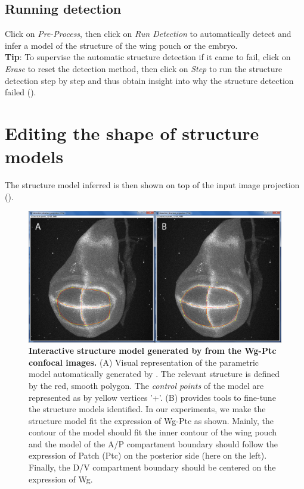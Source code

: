 \subsection{Running detection}
Click on \textit{Pre-Process}, then click on \textit{Run Detection} to automatically detect and infer a model of the structure of the wing pouch or the embryo.\\

\textbf{Tip}: To supervise the automatic structure detection if it came to fail, click on \textit{Erase} to reset the detection method, then click on \textit{Step} to run the structure detection step by step and thus obtain insight into why the structure detection failed ().

\section{Editing the shape of structure models}\label{sec:edit_structure_before_validation}
The structure model inferred is then shown on top of the input image projection ().

\begin{figure}[!h]
\centering
\includegraphics[scale=0.26]{images/wingj_structure_detection.jpg}
\caption{\textbf{Interactive structure model generated by \wingj from the Wg-Ptc confocal images.} (A) Visual representation of the parametric model automatically generated by \wingj. The relevant structure is defined by the red, smooth polygon. The \emph{control points} of the model are represented as by yellow vertices '+'. (B) \wingj provides tools to fine-tune the structure models identified. In our experiments, we make the structure model fit the expression of Wg-Ptc as shown. Mainly, the contour of the model should fit the inner contour of the wing pouch and the model of the A/P compartment boundary should follow the expression of Patch (Ptc) on the posterior side (here on the left). Finally, the D/V compartment boundary should be centered on the expression of Wg.}
\label{fig:wingj_structure_detection}
\end{figure}


